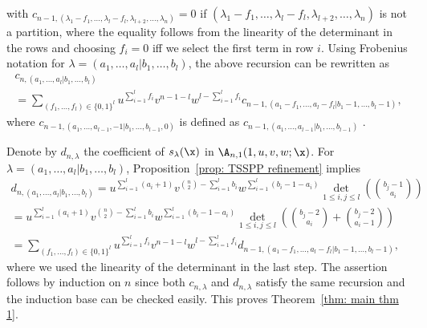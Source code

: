 with $c_{n-1,(\lambda_1 -f_1,\ldots,\lambda_l-f_l,\lambda_{l+2},\ldots,\lambda_n)}=0$ if $(\lambda_1 -f_1,\ldots,\lambda_l-f_l,\lambda_{l+2},\ldots,\lambda_n)$ is not a partition, where the equality follows from the linearity of the determinant in the rows and choosing $f_i=0$ iff we select the first term in row $i$.
Using Frobenius notation for $\lambda=(a_1,\ldots,a_l|b_1,\ldots,b_l)$, the above recursion can be rewritten as
\begin{multline*}
c_{n,(a_1,\ldots,a_l|b_1,\ldots,b_l)} \\
= \sum_{(f_1,\ldots,f_l) \in \{0,1\}^l} u ^{\sum_{i=1}^l f_i} v^{n-1-l} w^{l-\sum_{i=1}^l f_i}  c_{n-1,(a_1-f_1,\ldots,a_l-f_l|b_1-1,\ldots,b_l-1)},
\end{multline*}
where $c_{n-1,(a_1,\ldots,a_{l-1},-1|b_1,\ldots,b_{l-1},0)}$ is defined as $c_{n-1,(a_1,\ldots,a_{l-1}|b_1,\ldots,b_{l-1})}$ .

Denote by $d_{n,\lambda}$ the coefficient of $s_\lambda(\x)$ in $\A_{n,1}(1, u,v,w;\x)$. For $\lambda=(a_1,\ldots,a_l| \allowbreak b_1,\ldots,b_l)$, Proposition~\ref{prop: TSSPP refinement} implies 
\begin{multline*}
d_{n,(a_1,\ldots,a_l|b_1,\ldots,b_l)} 
= u^{\sum_{i=1}^l (a_i+1)} v^{\binom{n}{2}-\sum_{i=1}^l b_i} w^{\sum_{i=1}^l(b_i-1-a_i)} 
 \det_{1 \leq i,j \leq l} \left( \binom{b_j-1}{a_i} \right)\\
= u^{\sum_{i=1}^l (a_i+1)} v^{\binom{n}{2}-\sum_{i=1}^l b_i} w^{\sum_{i=1}^l(b_i-1-a_i)} 
 \det_{1 \leq i,j \leq l} \left( \binom{b_j-2}{a_i}+\binom{b_j-2}{a_i-1} \right)\\
 =  \sum_{(f_1,\ldots,f_l) \in \{0,1\}^l}  u^{\sum_{i=1}^l f_i} v^{n-1-l} w^{l-\sum_{i=1}^l f_i} 
 d_{n-1,(a_1-f_1,\ldots,a_l-f_l|b_1-1,\ldots,b_l-1)},
\end{multline*}
where we used the linearity of the determinant in the last step. The assertion follows by induction on $n$ since both $c_{n,\lambda}$ and $d_{n,\lambda}$ satisfy the same recursion and the induction base can be checked easily. This proves Theorem~\ref{thm: main thm 1}.

